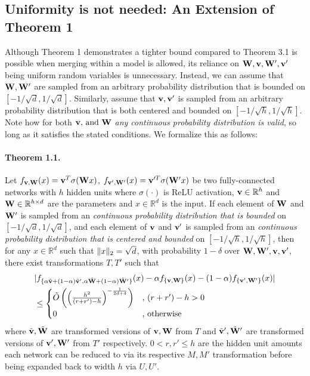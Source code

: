 \subsection{Uniformity is not needed: An Extension of Theorem 1}
Although Theorem 1 demonstrates a tighter bound compared to Theorem 3.1 is possible when merging within a model is allowed, its reliance on ${\mathbf{W}},{\mathbf{v}},{\mathbf{W'}},{\mathbf{v'}}$ being uniform random variables is unnecessary. Instead, we can assume that ${\mathbf{W}},{\mathbf{W'}}$ are sampled from an arbitrary probability distribution that is bounded on $[-1/\sqrt{d}, 1/\sqrt{d}]$. Similarly, assume that ${\mathbf{v}},{\mathbf{v'}}$ is sampled from an arbitrary probability distribution that is both centered and bounded on $[-1/\sqrt{h}, 1/\sqrt{h}]$. Note how for both ${\mathbf{v}}\text{, and }{\mathbf{W}}$ \textit{any continuous probability distribution is valid}, so long as it satisfies the stated conditions. We formalize this as follows:

\paragraph{Theorem 1.1.}\label{ap:theorem1_extended}
Let $f_{{\mathbf{v}},{\mathbf{W}}}(x)={\mathbf{v}}^T\sigma({\mathbf{W}} x)$, $f_{{\mathbf{v'}},{\mathbf{W'}}}(x)={\mathbf{v}}'^T\sigma({\mathbf{W}}' x)$ be two fully-connected networks with $h$ hidden units where $\sigma(\cdot)$ is ReLU activation, ${\mathbf{v}}\in\mathbb{R}^h$ and ${\mathbf{W}}\in\mathbb{R}^{h\times d}$ are the parameters and $x\in\mathbb{R}^d$ is the input. If each element of ${\mathbf{W}}$ and ${\mathbf{W'}}$ is sampled from an \textit{continuous probability distribution that is bounded} on $[-1/\sqrt{d},1/\sqrt{d}]$, and each element of ${\mathbf{v}}$ and ${\mathbf{v'}}$ is sampled from an \textit{continuous probability distribution that is centered and bounded} on $[-1/\sqrt{h},1/\sqrt{h}]$, then for any $x\in\mathbb{R}^d$ such that $\lVert x\rVert_2=\sqrt{d}$, with probability $1-\delta$ over ${\mathbf{W}},{\mathbf{W'}}, {\mathbf{v}}, {\mathbf{v'}}$, there exist transformations $T,T'$ such that
\begin{align}
    &|f_{\{\alpha\Tilde{{\mathbf{v}}} + (1-\alpha)\Tilde{{\mathbf{v}}}', \alpha\Tilde{{\mathbf{W}}}+(1-\alpha)\Tilde{{\mathbf{W}}}'\}}(x) - \alpha f_{\{{\mathbf{v}},{\mathbf{W}}\}}(x) - (1-\alpha)f_{\{{\mathbf{v}}',{\mathbf{W}}'\}}(x)| \nonumber \\
    &\leq\begin{cases}
            \Tilde{O}\left(\left(\frac{h^2}{(r+r')-h}\right)^{-\frac{1}{2d+4}}\right) & \text{, }(r+r')-h > 0 \\
            0 &\text{, otherwise}
        \end{cases}\label{eq:T_LMC_Extended}
\end{align}
where $\Tilde{{\mathbf{v}}},\Tilde{{\mathbf{W}}}$ are transformed versions of ${\mathbf{v}},{\mathbf{W}}$ from $T$ and $\Tilde{{\mathbf{v}}}',\Tilde{{\mathbf{W}}}'$ are transformed versions of ${\mathbf{v'}},{\mathbf{W'}}$ from $T'$ respectively. $0 < r, r' \leq h$ are the hidden unit amounts each network can be reduced to via its respective $M,M'$ transformation before being expanded back to width $h$ via $U,U'$.

